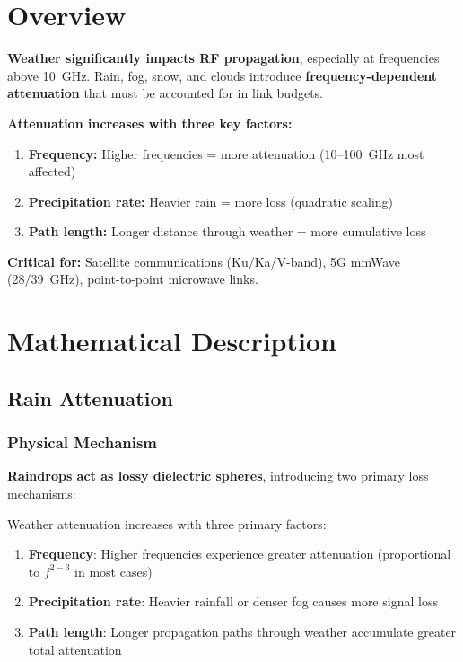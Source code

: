 \section{Overview}

\textbf{Weather significantly impacts RF propagation}, especially at frequencies above 10~GHz. Rain, fog, snow, and clouds introduce \textbf{frequency-dependent attenuation} that must be accounted for in link budgets.

\begin{keyconcept}
\textbf{Attenuation increases with three key factors:}
\begin{enumerate}
\item \textbf{Frequency:} Higher frequencies = more attenuation (10--100~GHz most affected)
\item \textbf{Precipitation rate:} Heavier rain = more loss (quadratic scaling)
\item \textbf{Path length:} Longer distance through weather = more cumulative loss
\end{enumerate}

\textbf{Critical for:} Satellite communications (Ku/Ka/V-band), 5G mmWave (28/39~GHz), point-to-point microwave links.
\end{keyconcept}

\section{Mathematical Description}

\subsection{Rain Attenuation}

\subsubsection{Physical Mechanism}

\textbf{Raindrops act as lossy dielectric spheres}, introducing two primary loss mechanisms:

\begin{keyconcept}
Weather attenuation increases with three primary factors:
\begin{enumerate}
\item \textbf{Frequency}: Higher frequencies experience greater attenuation (proportional to $f^{2-3}$ in most cases)
\item \textbf{Precipitation rate}: Heavier rainfall or denser fog causes more signal loss
\item \textbf{Path length}: Longer propagation paths through weather accumulate greater total attenuation
\end{enumerate}
\end{keyconcept}

